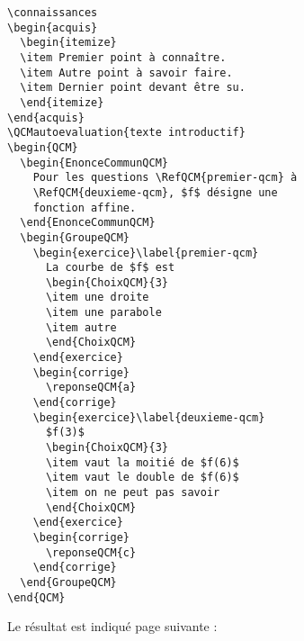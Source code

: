 \documentclass[nocrop]{sesamanuel}
\begin{document}
\begin{code}
\begin{verbatim}
\connaissances
\begin{acquis}
  \begin{itemize}
  \item Premier point à connaître.
  \item Autre point à savoir faire.
  \item Dernier point devant être su.
  \end{itemize}
\end{acquis}
\QCMautoevaluation{texte introductif}
\begin{QCM}
  \begin{EnonceCommunQCM}
    Pour les questions \RefQCM{premier-qcm} à
    \RefQCM{deuxieme-qcm}, $f$ désigne une
    fonction affine.
  \end{EnonceCommunQCM}
  \begin{GroupeQCM}
    \begin{exercice}\label{premier-qcm}
      La courbe de $f$ est
      \begin{ChoixQCM}{3}
      \item une droite
      \item une parabole
      \item autre
      \end{ChoixQCM}
    \end{exercice}
    \begin{corrige}
      \reponseQCM{a}
    \end{corrige}
    \begin{exercice}\label{deuxieme-qcm}
      $f(3)$
      \begin{ChoixQCM}{3}
      \item vaut la moitié de $f(6)$
      \item vaut le double de $f(6)$
      \item on ne peut pas savoir
      \end{ChoixQCM}
    \end{exercice}
    \begin{corrige}
      \reponseQCM{c}
    \end{corrige}
  \end{GroupeQCM}
\end{QCM}
\end{verbatim}
\end{code}
Le résultat est indiqué page suivante :
\end{document}
